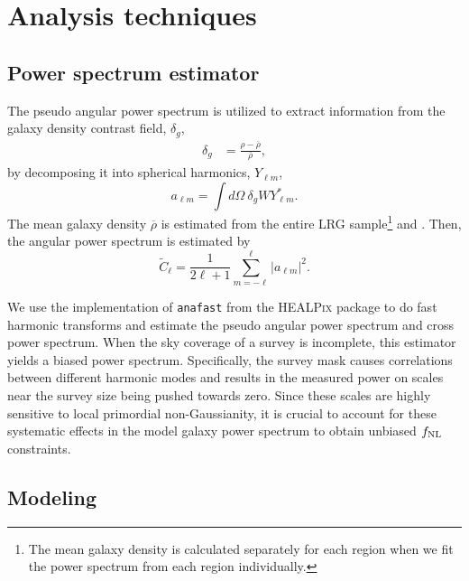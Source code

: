 \section{Analysis techniques}
\label{sec:method} 
 
\subsection{Power spectrum estimator}
The pseudo angular power spectrum \citep{hivon2002master} is utilized to extract information from the galaxy density contrast field, $\delta_{g}$, 
\begin{align}\label{eq:delta}
    \delta_{g} &= \frac{\rho- \overline{\rho}}{\overline{\rho}},
\end{align}
by decomposing it into spherical harmonics, $Y_{\ell m}$,
\begin{equation}
        a_{\ell m} = \int d\Omega ~ \delta_{g} W Y^{*}_{\ell m}.
\end{equation}
The mean galaxy density $\overline{\rho}$ is estimated from the entire LRG sample\footnote{The mean galaxy density is calculated separately for each region when we fit the power spectrum from each region individually.} and . Then, the angular power spectrum is estimated by
\begin{equation}\label{eq:pusedocell}
        \tilde{C}_{\ell} = \frac{1}{2\ell +1} \sum_{m=-\ell}^{\ell} |a_{\ell m}|^{2}.
\end{equation}

We use the implementation of \texttt{anafast} from the \textsc{HEALPix} package \citep{gorski2005healpix} to do fast harmonic transforms and estimate the pseudo angular power spectrum and cross power spectrum. When the sky coverage of a survey is incomplete, this estimator yields a biased power spectrum. Specifically, the survey mask causes correlations between different harmonic modes and results in the measured power on scales near the survey size being pushed towards zero. Since these scales are highly sensitive to local primordial non-Gaussianity, it is crucial to account for these systematic effects in the model galaxy power spectrum to obtain unbiased $f_{\rm NL}$ constraints.

 \subsection{Modeling}

